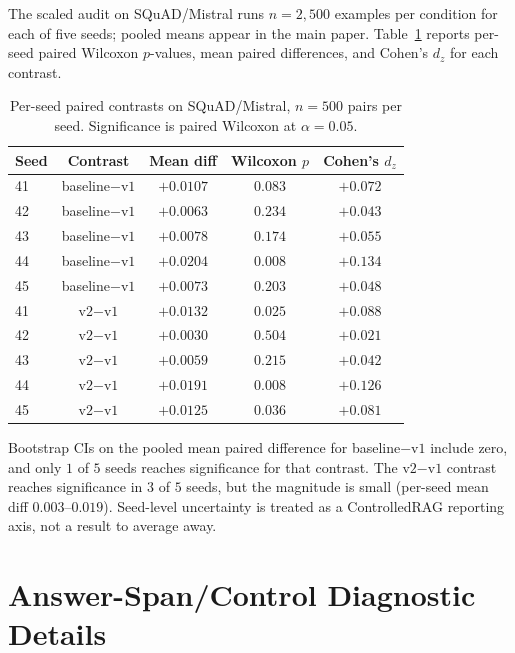 The scaled audit on SQuAD/Mistral runs $n=2{,}500$ examples per
condition for each of five seeds; pooled means appear in the main
paper. Table~\ref{tab:supp:scaled_per_seed} reports per-seed paired
Wilcoxon $p$-values, mean paired differences, and Cohen's $d_z$ for
each contrast.

\begin{table}[!htb]
\centering
\caption{Per-seed paired contrasts on SQuAD/Mistral, $n=500$ pairs per
seed. Significance is paired Wilcoxon at $\alpha=0.05$.}
\label{tab:supp:scaled_per_seed}
\footnotesize
\begin{tabular}{lcccc}
\toprule
Seed & Contrast & Mean diff & Wilcoxon $p$ & Cohen's $d_z$ \\
\midrule
41 & baseline$-$v$1$ & $+0.0107$ & $0.083$ & $+0.072$ \\
42 & baseline$-$v$1$ & $+0.0063$ & $0.234$ & $+0.043$ \\
43 & baseline$-$v$1$ & $+0.0078$ & $0.174$ & $+0.055$ \\
44 & baseline$-$v$1$ & $+0.0204$ & $\mathbf{0.008}$ & $+0.134$ \\
45 & baseline$-$v$1$ & $+0.0073$ & $0.203$ & $+0.048$ \\
\midrule
41 & v$2$$-$v$1$ & $+0.0132$ & $\mathbf{0.025}$ & $+0.088$ \\
42 & v$2$$-$v$1$ & $+0.0030$ & $0.504$ & $+0.021$ \\
43 & v$2$$-$v$1$ & $+0.0059$ & $0.215$ & $+0.042$ \\
44 & v$2$$-$v$1$ & $+0.0191$ & $\mathbf{0.008}$ & $+0.126$ \\
45 & v$2$$-$v$1$ & $+0.0125$ & $\mathbf{0.036}$ & $+0.081$ \\
\bottomrule
\end{tabular}
\end{table}

Bootstrap CIs on the pooled mean paired difference for
baseline$-$v$1$ include zero, and only $1$ of $5$ seeds reaches
significance for that contrast. The v$2$$-$v$1$ contrast reaches
significance in $3$ of $5$ seeds, but the magnitude is small (per-seed
mean diff $0.003$--$0.019$). Seed-level uncertainty is treated as a
ControlledRAG reporting axis, not a result to average away.

\section{Answer-Span/Control Diagnostic Details}
\label{app:span_control}

